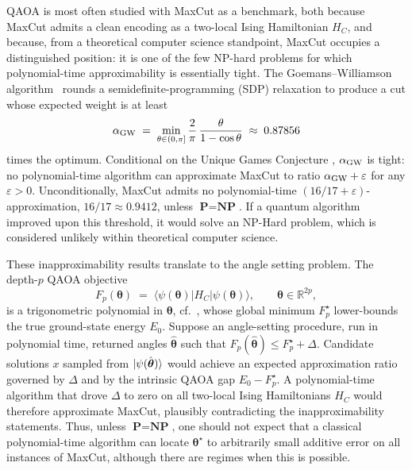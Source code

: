 \documentclass[twocolumn,
english,
aps,
pra,
10pt,
longbibliography,
superscriptaddress,
amsmath,
amssymb,
floatfix
]{revtex4-2}
\begin{document}
QAOA is most often studied with MaxCut as a benchmark, both because MaxCut admits a clean encoding as a two-local Ising Hamiltonian $H_C$, and because, from a theoretical computer science standpoint, MaxCut occupies a distinguished position: it is one of the few NP-hard problems for which polynomial-time approximability is essentially tight.
The Goemans--Williamson algorithm~\cite{goemans1995improved} rounds a semidefinite-programming (SDP) relaxation to produce a cut whose expected weight is at least
\begin{equation}
\alpha_{\rm GW}\;=\;\min_{\theta\in(0,\pi]}\frac{2}{\pi}\,\frac{\theta}{1-\cos\theta}\;\approx\;0.87856
\label{GWratio}
\end{equation}
times the optimum.
Conditional on the Unique Games Conjecture \cite{khot2010unique}, $\alpha_{\rm GW}$ is tight: no polynomial-time algorithm can approximate MaxCut to ratio $\alpha_{\rm GW}+\varepsilon$ for any $\varepsilon>0$.
Unconditionally, MaxCut admits no polynomial-time $(16/17+\varepsilon)$-approximation, $16/17\approx 0.9412$, unless $\textbf{P}=\textbf{NP}$.
If a quantum algorithm improved upon this threshold, it would solve an NP-Hard problem, which is considered unlikely within theoretical computer science.

These inapproximability results translate to the angle setting problem. 
The depth-$p$ QAOA objective
\begin{equation}
F_p(\boldsymbol{\theta})\;=\;\langle\psi(\boldsymbol{\theta})|H_C|\psi(\boldsymbol{\theta})\rangle,\qquad \boldsymbol{\theta}\in\mathbb{R}^{2p},
\label{eq:qaoa_objective}
\end{equation}
is a trigonometric polynomial in $\boldsymbol{\theta}$, cf.~\cite{sakos2026global},  whose global minimum $F_p^\star$ lower-bounds the true ground-state energy $E_0$. 
Suppose an angle-setting procedure, run in polynomial time, returned angles $\hat{\boldsymbol{\theta}}$ such that $F_p(\hat{\boldsymbol{\theta}})\leq F_p^\star+\Delta$.
Candidate solutions $x$ sampled from $\ket{\psi(\hat{\boldsymbol{\theta}})}$ would achieve an expected approximation ratio governed by $\Delta$ and by the intrinsic QAOA gap $E_0-F_p^\star$.
A polynomial-time algorithm that drove $\Delta$ to zero on all two-local Ising Hamiltonians $H_C$ would therefore approximate MaxCut, plausibly contradicting the inapproximability statements.
Thus, unless $\textbf{P}=\textbf{NP}$, one should not expect that a classical  polynomial-time algorithm can locate $\boldsymbol{\theta}^\star$ to arbitrarily small additive error on all instances of MaxCut, although there are regimes \cite{sakos2026global} when this is possible.
\end{document}
